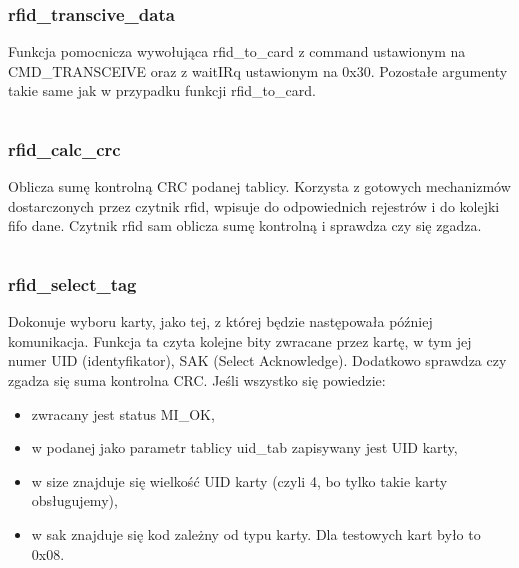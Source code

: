 \documentclass[12pt,hidelinks]{article}
\begin{document}
    \inputminted[linenos=true]{c++}{rfid_code/rfid_to_card.c}

    \subsubsection{rfid\_transcive\_data}
    Funkcja pomocnicza wywołująca rfid\_to\_card z command ustawionym na CMD\_TRANSCEIVE oraz z waitIRq ustawionym na 0x30. Pozostałe argumenty takie same jak w przypadku funkcji rfid\_to\_card.
    \inputminted[linenos=true]{c++}{rfid_code/rfid_transcive_data.c}

    \subsubsection{rfid\_calc\_crc}
    Oblicza sumę kontrolną CRC podanej tablicy. Korzysta z gotowych mechanizmów dostarczonych przez czytnik rfid, wpisuje do odpowiednich rejestrów i do kolejki fifo dane. Czytnik rfid sam oblicza sumę kontrolną i sprawdza czy się zgadza.
    \inputminted[linenos=true]{c++}{rfid_code/rfid_calc_crc.c}

    \subsubsection{rfid\_select\_tag}
    Dokonuje wyboru karty, jako tej, z której będzie następowała później komunikacja. Funkcja ta czyta kolejne bity zwracane przez kartę, w tym jej numer UID (identyfikator), SAK (Select Acknowledge). Dodatkowo sprawdza czy zgadza się suma kontrolna CRC. Jeśli wszystko się powiedzie:
    \begin{itemize}
        \item zwracany jest status MI\_OK,
        \item w podanej jako parametr tablicy uid\_tab zapisywany jest UID karty,
        \item w size znajduje się wielkość UID karty (czyli 4, bo tylko takie karty obsługujemy),
        \item w sak znajduje się kod zależny od typu karty. Dla testowych kart było to 0x08.
    \end{itemize}
    \inputminted[linenos=true]{c++}{rfid_code/rfid_select_tag.c}
\end{document}
